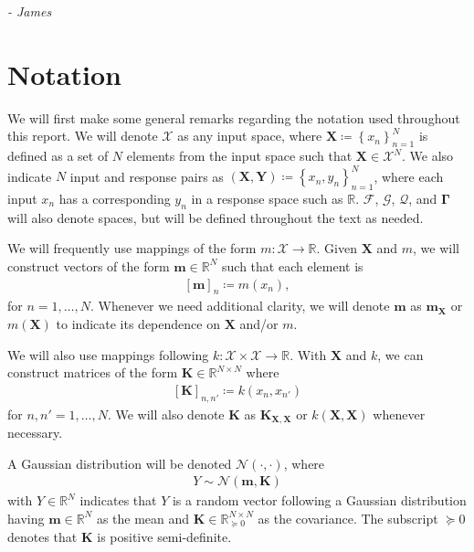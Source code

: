 \documentclass{article}
\numberwithin{equation}{section}
\begin{document}
\hspace*{\fill} \textit{- James}

\newpage
\tableofcontents
\newpage
{}
\setcounter{page}{1}
\setcounter{section}{-1}


\newpage
\section{Notation}
We will first make some general remarks regarding the notation used throughout this report. 
We will denote $\mathcal{X}$ as any input space, where $\mathbf{X} \coloneqq \left\{x_n\right\}_{n=1}^N$ is defined as a set of $N$ elements from the input space such that $\mathbf{X} \in \mathcal{X}^N$.
We also indicate $N$ input and response pairs as $\left(\mathbf{X}, \mathbf{Y}\right) \coloneqq \left\{x_n, y_n\right\}_{n=1}^N$, where each input $x_n$ has a corresponding $y_n$ in a response space such as $\mathbb{R}$.
$\boldsymbol{\boldsymbol{\mathcal{F}}}$, $\boldsymbol{\mathcal{G}}$, $\boldsymbol{\mathcal{Q}}$, and $\boldsymbol{\Gamma}$ will also denote spaces, but will be defined throughout the text as needed.

We will frequently use mappings of the form $m: \mathcal{X} \rightarrow \mathbb{R}$. 
Given $\mathbf{X}$ and $m$, we will construct vectors of the form $\mathbf{m} \in \mathbb{R}^N$ such that each element is
\begin{align}
    \left[\mathbf{m}\right]_{n} \coloneqq m(x_n),
\end{align}
for $n=1,\dots, N$. Whenever we need additional clarity, we will denote $\mathbf{m}$ as $\mathbf{m}_{\mathbf{X}}$ or $m\left(\mathbf{X}\right)$ to indicate its dependence on $\mathbf{X}$ and/or $m$.

We will also use mappings following $k: \mathcal{X} \times \mathcal{X} \rightarrow \mathbb{R}$.
With $\mathbf{X}$ and $k$, we can construct matrices of the form $\mathbf{K} \in \mathbb{R}^{N\times N}$ where
\begin{align}
    \left[\mathbf{K}\right]_{n, n'} \coloneqq k(x_n, x_{n'})
\end{align}
for $n, n'=1,\dots,N$. 
We will also denote $\mathbf{K}$ as $\mathbf{K}_{\mathbf{X}, \mathbf{X}}$ or $k\left(\mathbf{X}, \mathbf{X}\right)$ whenever necessary.

A Gaussian distribution will be denoted $\mathcal{N}(\cdot, \cdot)$, where 
\begin{align}
    Y \sim \mathcal{N}(\mathbf{m}, \mathbf{K})
\end{align}
with $Y \in \mathbb{R}^N$ indicates that $Y$ is a random vector following a Gaussian distribution having $\mathbf{m} \in \mathbb{R}^N$ as the mean and $\mathbf{K} \in \mathbb{R}^{N \times N}_{\succcurlyeq 0}$ as the covariance. 
The subscript ${\succcurlyeq 0}$ denotes that $\mathbf{K}$ is positive semi-definite.
\end{document}
